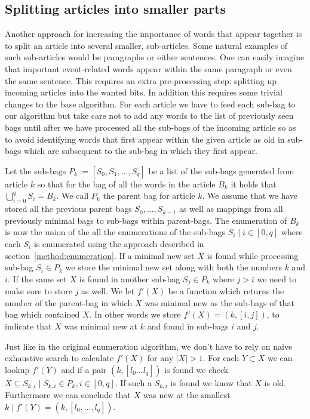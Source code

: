 \subsection{Splitting articles into smaller parts}
Another approach for increasing the importance of words that appear together is to split an article into several smaller, sub-articles. Some natural examples of such sub-articles would be paragraphs or either sentences. One can easily imagine that important event-related words appear within the same paragraph or even the same sentence. This requires an extra pre-processing step: splitting up incoming articles into the wanted bits. In addition this requires some trivial changes to the base algorithm. For each article we have to feed each sub-bag to our algorithm but take care not to add any words to the list of previously seen bags until after we have processed all the sub-bags of the incoming article so as to avoid identifying words that first appear within the given article as old in sub-bags which are subsequent to the sub-bag in which they first appear.

Let the sub-bags $P_{k} := [S_{0}, S_{1},...,S_{q}]$ be a list of the sub-bags generated from article $k$ so that for the bag of all the words in the article $B_{k}$ it holds that $\bigcup_{i=0}^{q}S_{i} = B_{k}$. We call $P_{k}$ the parent bag for article $k$. We assume that we have stored all the previous parent bags $S_{0},...,S_{k-1}$ as well as mappings from all previously minimal bags to sub-bags within parent-bags. The enumeration of $B_{k}$ is now the union of the all the enumerations of the sub-bags $S_{i} \mid i \in [0,q]$ where each $S_{i}$ is enumerated using the approach described in section~\ref{method:enumeration}. If a minimal new set $X$ is found while processing sub-bag $S_{i} \in P_{k}$ we store the minimal new set along with both the numbers $k$ and $i$. If the same set $X$ is found in another sub-bag $S_{j} \in P_{k}$ where $j>i$ we need to make sure to store $j$ as well. We let $f'(X)$ be a function which returns the number of the  parent-bag in which $X$ was minimal new as the sub-bags of that bag which contained $X$. In other words we store $f'(X) = (k, [i,j])$, to indicate that $X$ was minimal new at $k$ and found in sub-bags $i$ and $j$. 

Just like in the original enumeration algorithm, we don't have to rely on naive exhaustive search to calculate $f'(X)$ for any $|X|>1$. For each $Y\subset X$ we can lookup $f'(Y)$ and if a pair $(k, [l_{0}... l_{q}])$ is found we check $X \subseteq S_{k, i} \mid S_{k, i} \in P_{k}, i\in[0,q]$. If such a $S_{k,i}$ is found we know that $X$ is old. Furthermore we can conclude that $X$ was new at the smallest $k \mid f'(Y)=(k, [l_{0},..., l_{q}])$.

